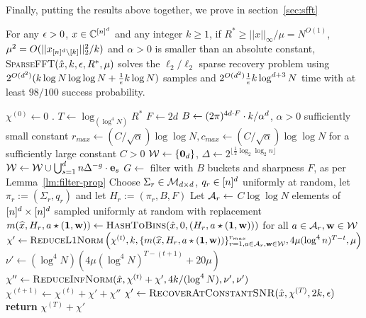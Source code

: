 Finally, putting the results above together, we prove in section~\ref{sec:sfft}

\begin{theorem}\label{thm:main}
For any ${\epsilon}>0$, $x\in \mathbb{C}^{[n]^d}$ and any integer $k\geq 1$, if $R^*\geq ||x||_\infty/\mu=N^{O(1)}$, $\mu^2=O(||x_{{[n]^d}\setminus [k]}||_2^2/k)$  and $\alpha>0$ is smaller than an absolute constant, \textsc{SparseFFT}$(\hat x, k, {\epsilon}, R^*, \mu)$ solves the $\ell_2/\ell_2$ sparse recovery problem using $2^{O(d^2)} (k\log N \log\log N+\frac1{{\epsilon}}k\log N)$ samples and 
$2^{O(d^2)} \frac1{{\epsilon}}k \log^{d+3} N$ time with at least $98/100$ success probability.
\end{theorem}


\begin{algorithm}
\caption{\textsc{SparseFFT}($\hat x, k, \e, R^*, \mu$)}\label{alg:main-sublinear} 
\begin{algorithmic}[1] 
\State $\chi^{(0)} \gets 0$ .
\State $T \gets \log_{(\log^4 N)} R^*$
\State $F\gets 2d$
\State $B\leftarrow (2\pi)^{4d\cdot F}\cdot k/\alpha^d$, $\alpha>0$ sufficiently small constant
\State $r_{max}\gets (C/\sqrt{\alpha})\log\log N, c_{max}\gets (C/\sqrt{\alpha})\log\log N$ for a sufficiently large constant $C>0$
\State $\mathcal{W}\gets \{\mathbf{0}_d\}$, $\Delta\gets 2^{\lfloor \frac1{2}\log_2 \log_2 n\rfloor}$ 
\State $\mathcal{W}\gets \mathcal{W}\cup \bigcup_{s=1}^d n \Delta^{-g} \cdot \mathbf{e}_s$ 
\EndFor
\State $G\gets$ filter with $B$ buckets and sharpness $F$, as per Lemma~\ref{lm:filter-prop}
\State Choose $\Sigma_r\in \mathcal{M}_{d\times d}$, $q_r\in {[n]^d}$ uniformly at random, let $\pi_r:=(\Sigma_r, q_r)$ and let $H_r:=(\pi_r, B, F)$
\State Let ${\mathcal{A}}_r\gets $ $C\log\log N$ elements of ${[n]^d}\times {[n]^d}$ sampled uniformly at random with replacement
\For {$\h\in \H$}
\State $m(\wh{x}, H_r, a\star(\one, \h))\gets \Call{HashToBins}{\hat x, 0, (H_r, a\star (\one, \h))}$ for all $a\in {\mathcal{A}}_r, \mathbf{w}\in \mathcal{W}$
\EndFor
\EndFor
{}
\State $\chi' \gets \textsc{ReduceL1Norm}\left(\chi^{(t)}, k, \{m(\widehat{x}, H_r, a\star (\mathbf{1}, \mathbf{w}))\}_{r=1, a\in {\mathcal{A}}_r, \mathbf{w}\in \mathcal{W}}^{r_{max}}, 4\mu (\log^4 n)^{T-t}, \mu\right)$ 
\State{}
\State $\nu'\gets (\log^4 N)(4\mu (\log^4 N)^{T-(t+1)}+20\mu)$ 
\State $\chi'' \gets \Call{ReduceInfNorm}{\hat x,  \chi^{(t)}+\chi', 4k/(\log^4 N),  \nu', \nu'}$
\State{}
\State $\chi^{(t+1)} \gets \chi^{(t)} + \chi'+\chi''$
\EndFor
\State $\chi' \gets \textsc{RecoverAtConstantSNR}(\hat x, \chi^{(T)}, 2k, \epsilon)$
\State \textbf{return} $\chi^{(T)} + \chi'$
\EndProcedure 
\end{algorithmic}
\end{algorithm}




